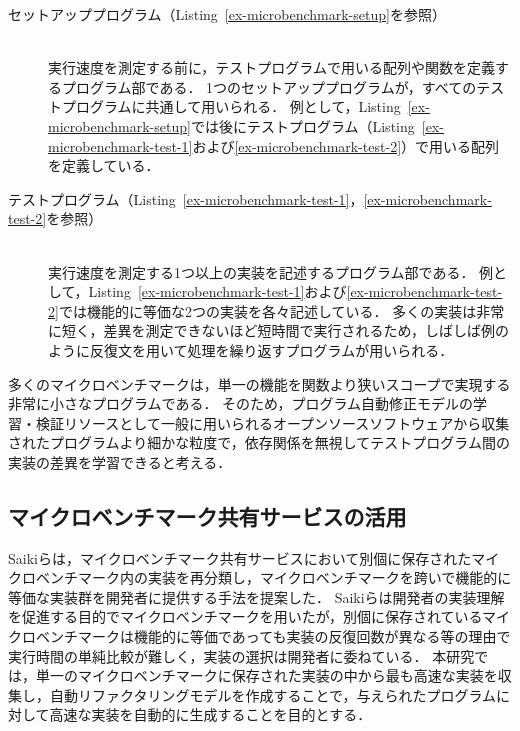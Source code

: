 \documentclass[11pt]{jreport}
\newcommand{\fix}[1]{#1}
\begin{document}
\begin{description}

\item[セットアッププログラム（Listing~\ref{ex-microbenchmark-setup}を参照）]\mbox{}\\
実行速度を測定する前に，テストプログラムで用いる配列や関数を定義するプログラム部である．
1つのセットアッププログラムが，すべてのテストプログラムに共通して用いられる．
例として，Listing~\ref{ex-microbenchmark-setup}では後にテストプログラム（Listing~\ref{ex-microbenchmark-test-1}および\ref{ex-microbenchmark-test-2}）で用いる配列を定義している．

\item[テストプログラム（Listing~\ref{ex-microbenchmark-test-1}，\ref{ex-microbenchmark-test-2}を参照）]\mbox{}\\
実行速度を測定する1つ以上の実装を記述するプログラム部である．
例として，Listing~\ref{ex-microbenchmark-test-1}および\ref{ex-microbenchmark-test-2}では\fix{機能的に等価}な2つの実装を各々記述している．
多くの実装は非常に短く，差異を測定できないほど短時間で実行されるため，しばしば例のように反復文を用いて処理を繰り返すプログラムが用いられる．

\end{description}


多くのマイクロベンチマークは，単一の機能を関数より狭いスコープで実現する非常に小さなプログラムである．
そのため，プログラム自動修正モデルの学習\fix{・検証}リソースとして一般に用いられる\fix{オープンソースソフトウェアから収集されたプログラム\cite{Husain_2019,Lu_2021}}より細かな粒度で，依存関係を無視してテストプログラム間の実装の差異を学習できると考える．




\subsection{マイクロベンチマーク共有サービスの活用}


Saikiら\cite{Saiki_2021}は，マイクロベンチマーク共有サービスにおいて別個に保存されたマイクロベンチマーク内の実装を再分類し，マイクロベンチマークを跨いで機能的に等価な実装群を開発者に提供する手法を提案した．
Saikiらは開発者の実装理解を促進する目的でマイクロベンチマークを用いたが，別個に保存されているマイクロベンチマークは機能的に等価であっても実装の反復回数が異なる等の理由で実行時間の単純比較が難しく，実装の選択は開発者に委ねている．
本研究では，単一のマイクロベンチマークに保存された実装の中から最も高速な実装を収集し，自動リファクタリングモデルを作成することで，与えられたプログラムに対して高速な実装を自動的に生成することを目的とする．
\end{document}
